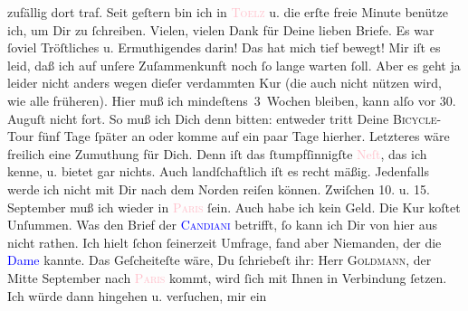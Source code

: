                zufällig dort traf. Seit geſtern bin ich in \textsc{\textcolor{pink}{Toelz}{}\ledrightnote{\textcolor{pink}{Bad Tölz}}} u. die erſte freie Minute benütze ich, um Dir zu ſchreiben.\pend
           \pstart
           Vielen, vielen Dank für Deine lieben Briefe. Es war ſoviel Tröſtliches u.
               Ermuthigendes darin! Das hat mich tief bewegt! {\dotsfive}\pend
           \pstart
           Mir iſt es leid, daß ich auf unſere Zuſammenkunft noch ſo lange warten {\pb}ſoll. Aber es geht ja leider nicht anders wegen
               dieſer verdammten Kur (die auch nicht nützen wird, wie alle früheren). Hier muß ich
               mindeſtens 3 Wochen bleiben, kann alſo vor 30.{ }Auguſt nicht fort. So muß ich Dich denn bitten: entweder
               tritt Deine \textsc{Bicycle}-Tour fünf Tage ſpäter an {\pb}oder komme auf ein paar Tage hierher. Letzteres wäre
               freilich eine  Zumuthung für Dich. Denn \label{K_L02743-2v}\label{K_L02743-2h} iſt das ſtumpfſinnigſte \textcolor{pink}{Neſt}{}, das ich kenne, u.  bietet gar nichts. Auch landſchaftlich iſt es recht
               mäßig. Jedenfalls werde ich nicht mit Dir nach dem Norden reiſen können. Zwiſchen
                  10. u. 15. September{ }{\pb}muß ich wieder in \textsc{\textcolor{pink}{Paris}{}\ledrightnote{\textcolor{pink}{Paris}}} ſein. Auch habe ich kein Geld. Die Kur koſtet Unſummen.\pend
           \pstart
           Was den Brief der \textsc{\textcolor{blue}{Candiani}{}\ledrightnote{\textcolor{blue}{Regina Candiani}}} betrifft, ſo kann ich Dir von hier aus nicht rathen. Ich hielt ſchon ſeinerzeit
               Umfrage, fand aber Niemanden, der die \textcolor{blue}{Dame}{}\ledrightnote{\textcolor{blue}{Regina Candiani}}
               kannte. Das Geſcheiteſte wäre, Du ſchriebeſt ihr: Herr \textsc{Goldmann}, der Mitte September{ }{\pb}nach \textsc{\textcolor{pink}{Paris}{}\ledrightnote{\textcolor{pink}{Paris}}} kommt, wird ſich mit Ihnen in Verbindung ſetzen. Ich würde dann hingehen u.
               verſuchen, mir \label{K_L02743-3v}\label{K_L02743-3h} ein
